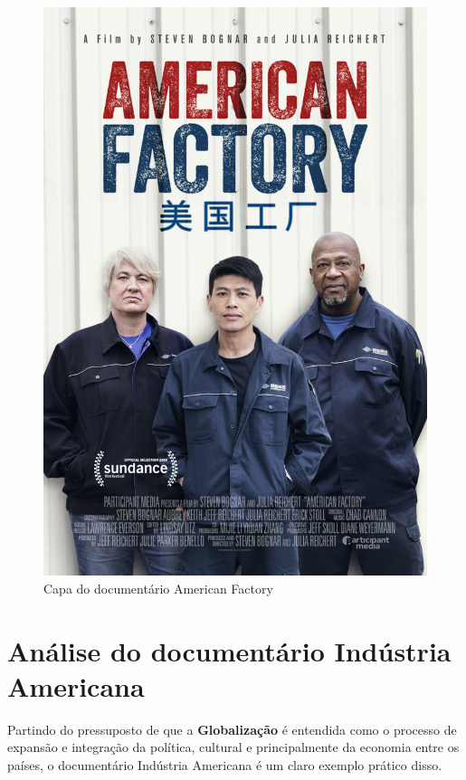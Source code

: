 \documentclass[12pt,a4paper,oneside]{article}
\begin{document}
\begin{onehalfspace}
\begin{figure} [H]
\centering
\includegraphics[scale=0.3]{Fig/AmericanFactory.jpg} 
\caption{Capa do documentário American Factory}
\label{fig:MapGrandNaveg}
\end{figure}

\newpage
\section{Análise do documentário Indústria Americana}

\hspace{1.5cm} Partindo do pressuposto de que a \textbf{Globalização} é entendida como o processo de expansão e integração da política, cultural e principalmente da economia entre os países, o documentário Indústria Americana é um claro exemplo prático disso.


\end{onehalfspace}
\end{document}
